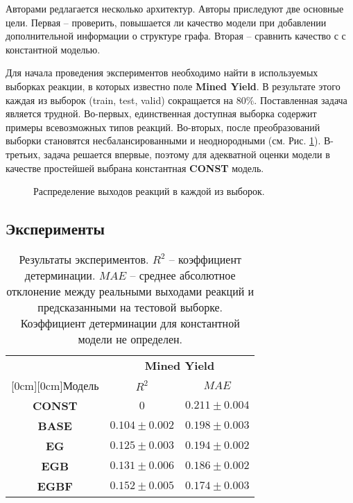 \documentclass[12pt, twoside]{article}
\begin{document}
Авторами редлагается несколько архитектур. Авторы приследуют две основные цели. Первая -- проверить, повышается ли качество модели при добавлении дополнительной информации о структуре графа. Вторая -- сравнить качество с с константной моделью.


Для начала проведения экспериментов необходимо найти в используемых выборках реакции, в которых известно поле \textbf{Mined Yield}. В результате этого каждая из выборок (train, test, valid) сокращается на $80\%$.
Поставленная задача является трудной. Во-первых, единственная доступная выборка содержит примеры всевозможных типов реакций. Во-вторых, после преобразований выборки становятся несбалансированными и неоднородными (см. Рис. \ref{fig:hist}). В-третьих, задача решается впервые,
поэтому для адекватной оценки модели в качестве простейшей выбрана константная \textbf{CONST} модель.
 

 \begin{figure}[h!]

    
 \caption{\label{fig:hist} Распределение выходов реакций в каждой из выборок.}
\end{figure}


\subsection{Эксперименты}



\begin{table}[h!]
\caption{\label{tab:Models} Результаты экспериментов. $R^2$ -- коэффициент детерминации. $MAE$ -- среднее абсолютное отклонение между реальными выходами реакций и предсказанными на тестовой выборке. Коэффициент детерминации для константной модели не определен.}
\begin{center}
\begin{tabular}{|c|c|c|}
\hline
& \multicolumn{2}{c|}{\textbf{Mined Yield}} \\
\cline{2-3}
\raisebox{1.5ex}[0cm][0cm]{Модель}
& $R^2$ & $MAE$ \\
\hline
\textbf{CONST} & $0$ & $0.211 \pm 0.004$\\
\hline
\textbf{BASE} & $0.104 \pm 0.002$ & $0.198 \pm 0.003$ \\
\hline
\textbf{EG} & $0.125 \pm 0.003$ & $0.194 \pm 0.002$\\
\hline
\textbf{EGB} & $0.131 \pm 0.006$ & $0.186 \pm 0.002$\\
\hline
\textbf{EGBF} & $0.152 \pm 0.005$ & $0.174 \pm 0.003$\\
\hline
\end{tabular}
\end{center}

\end{table}
\end{document}
